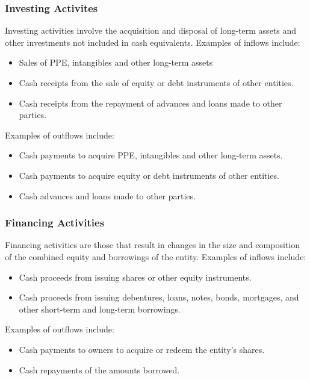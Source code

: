 \documentclass[../main.tex]{subfiles}
\begin{document}
	\subsubsection{Investing Activites}
	
	Investing activities involve the acquisition and disposal of long-term 
	assets and other investments not included in cash equivalents. Examples of 
	inflows include:
	\begin{itemize}[noitemsep]
		\item Sales of PPE, intangibles and other long-term assets
		\item Cash receipts from the sale of equity or debt instruments of 
		other entities.
		\item Cash receipts from the repayment of advances and loans made to 
		other parties.
	\end{itemize}
	Examples of outflows include: 
	\begin{itemize}[noitemsep]
		\item Cash payments to acquire PPE, intangibles and other long-term 
		assets.
		\item Cash payments to acquire equity or debt instruments of other 
		entities.
		\item Cash advances and loans made to other parties. 
	\end{itemize}
	
	\subsubsection{Financing Activities}
	
	Financing activities are those that result in changes in the size and 
	composition of the combined equity and borrowings of the entity. Examples 
	of inflows include:
	\begin{itemize}[noitemsep]
		\item Cash proceeds from issuing shares or other equity instruments.
		\item Cash proceeds from issuing debentures, loans, notes, bonds, 
		mortgages, and other short-term and long-term borrowings. 
	\end{itemize}
	Examples of outflows include:
	\begin{itemize}[noitemsep]
		\item Cash payments to owners to acquire or redeem the entity's shares.
		\item Cash repayments of the amounts borrowed. 
	\end{itemize}
	
\end{document}
